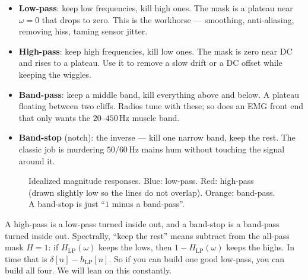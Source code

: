 \begin{itemize}
\item \textbf{Low-pass}: keep low frequencies, kill high ones. The mask is a
plateau near $\omega=0$ that drops to zero. This is the workhorse --- smoothing,
anti-aliasing, removing hiss, taming sensor jitter.
\item \textbf{High-pass}: keep high frequencies, kill low ones. The mask is zero
near DC and rises to a plateau. Use it to remove a slow drift or a DC offset
while keeping the wiggles.
\item \textbf{Band-pass}: keep a middle band, kill everything above and below. A
plateau floating between two cliffs. Radios tune with these; so does an EMG front
end that only wants the $20$--$450$\,Hz muscle band.
\item \textbf{Band-stop} (notch): the inverse --- kill one narrow band, keep the
rest. The classic job is murdering $50/60$\,Hz mains hum without touching the
signal around it.
\end{itemize}

\begin{figure}[H]
\centering
{}
\caption{Idealized magnitude responses. Blue: low-pass. Red: high-pass (drawn
slightly low so the lines do not overlap). Orange: band-pass. A band-stop is just
``$1$ minus a band-pass''.}
\label{ch16:fig-masks}
\end{figure}

\begin{intuitionbox}
A high-pass is a low-pass turned inside out, and a band-stop is a band-pass turned
inside out. Spectrally, ``keep the rest'' means subtract from the all-pass mask
$H=1$: if $H_{\text{LP}}(\omega)$ keeps the lows, then $1 - H_{\text{LP}}(\omega)$
keeps the highs. In time that is $\delta[n] - h_{\text{LP}}[n]$. So if you can
build one good low-pass, you can build all four. We will lean on this constantly.
\end{intuitionbox}

